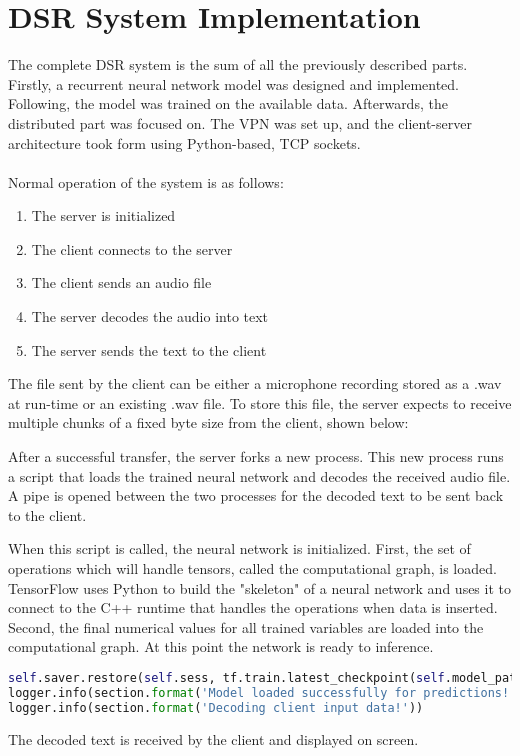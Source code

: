 \section{DSR System Implementation}
The complete DSR system is the sum of all the previously described parts. Firstly, a recurrent neural network model was designed and implemented. Following, the model was trained on the available data.
Afterwards, the distributed part was focused on. The VPN was set up, and the client-server architecture took form using Python-based, TCP sockets.\\\\
Normal operation of the system is as follows:
\begin{enumerate}
\item The server is initialized
\item The client connects to the server
\item The client sends an audio file
\item The server decodes the audio into text
\item The server sends the text to the client
\end{enumerate}
The file sent by the client can be either a microphone recording stored as a .wav at run-time or an existing .wav file. To store this file, the server expects to receive multiple chunks of a fixed byte size from the client, shown below:
 
After a successful transfer, the server forks a new process. 
This new process runs a script that loads the trained neural network and decodes the received audio file. A pipe is opened between the two processes for the decoded text to be sent back to the client.

When this script is called, the neural network is initialized.
First, the set of operations which will handle tensors, called the computational graph, is loaded. 
TensorFlow uses Python to build the "skeleton" of a neural network and uses it to connect to the C++ runtime that handles the operations when data is inserted.
Second, the final numerical values for all trained variables are loaded into the computational graph. At this point the network is ready to inference.
\begin{lstlisting}[language=Python, flexiblecolumns=true, caption=Model restore.]
self.saver.restore(self.sess, tf.train.latest_checkpoint(self.model_path))
logger.info(section.format('Model loaded successfully for predictions!'))
logger.info(section.format('Decoding client input data!'))
\end{lstlisting}
The decoded text is received by the client and displayed on screen.

